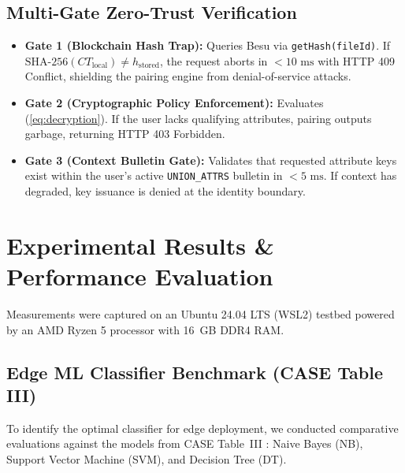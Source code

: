 \documentclass[conference]{IEEEtran}
\begin{document}
\subsection{Multi-Gate Zero-Trust Verification}
\begin{itemize}
    \item \textbf{Gate 1 (Blockchain Hash Trap):} Queries Besu via \texttt{getHash(fileId)}. If $\text{SHA-256}(CT_{\text{local}}) \neq h_{\text{stored}}$, the request aborts in $<10\text{ ms}$ with HTTP 409 Conflict, shielding the pairing engine from denial-of-service attacks.
    \item \textbf{Gate 2 (Cryptographic Policy Enforcement):} Evaluates (\ref{eq:decryption}). If the user lacks qualifying attributes, pairing outputs garbage, returning HTTP 403 Forbidden.
    \item \textbf{Gate 3 (Context Bulletin Gate):} Validates that requested attribute keys exist within the user's active \texttt{UNION\_ATTRS} bulletin in $<5\text{ ms}$. If context has degraded, key issuance is denied at the identity boundary.
\end{itemize}

\section{Experimental Results \& Performance Evaluation}
Measurements were captured on an Ubuntu 24.04 LTS (WSL2) testbed powered by an AMD Ryzen 5 processor with 16~GB DDR4 RAM.

\subsection{Edge ML Classifier Benchmark (CASE Table III)}
To identify the optimal classifier for edge deployment, we conducted comparative evaluations against the models from CASE Table~III \cite{ghosh2022case}: Naive Bayes (NB), Support Vector Machine (SVM), and Decision Tree (DT).

\begin{table}[htbp]
\caption{Edge Machine Learning Performance Benchmark (CASE Table III Validation)}
\label{tab:ml_benchmark}
\centering
{}
\end{table}
\end{document}

